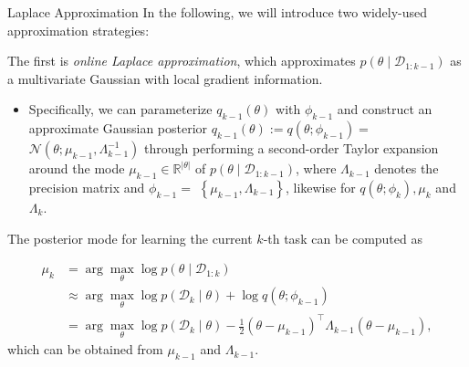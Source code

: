\documentclass[9pt,dvipsnames]{beamer}
\begin{document}
\begin{frame}{Laplace Approximation}
    In the following, we will introduce two widely-used approximation strategies:

    The first is \textit{online Laplace approximation}, which approximates $p\left(\theta \mid \mathcal{D}_{1: k-1}\right)$ as a multivariate Gaussian with local gradient information.
    \begin{itemize}
        \item Specifically, we can parameterize $q_{k-1}(\theta)$ with $\phi_{k-1}$ and construct an approximate Gaussian posterior $q_{k-1}(\theta):=q\left(\theta ; \phi_{k-1}\right)=$ $\mathcal{N}\left(\theta ; \mu_{k-1}, \Lambda_{k-1}^{-1}\right)$ through performing a second-order Taylor expansion around the mode $\mu_{k-1} \in \mathbb{R}^{|\theta|}$ of $p\left(\theta \mid \mathcal{D}_{1: k-1}\right)$, where $\Lambda_{k-1}$ denotes the precision matrix and $\phi_{k-1}=$ $\left\{\mu_{k-1}, \Lambda_{k-1}\right\}$, likewise for $q\left(\theta ; \phi_{k}\right), \mu_{k}$ and $\Lambda_{k}$.
    \end{itemize}
    The posterior mode for learning the current $k$-th task can be computed as

    $$
        \begin{aligned}
            \mu_{k} & =\arg \max _{\theta} \log p\left(\theta \mid \mathcal{D}_{1: k}\right)                                                                                          \\
                    & \approx \arg \max _{\theta} \log p\left(\mathcal{D}_{k} \mid \theta\right)+\log q\left(\theta ; \phi_{k-1}\right)                                               \\
                    & =\arg \max _{\theta} \log p\left(\mathcal{D}_{k} \mid \theta\right)-\frac{1}{2}\left(\theta-\mu_{k-1}\right)^{\top} \Lambda_{k-1}\left(\theta-\mu_{k-1}\right),
        \end{aligned}
    $$
    which can be obtained from $\mu_{k-1}$ and $\Lambda_{k-1}$.
\end{frame}
\end{document}
